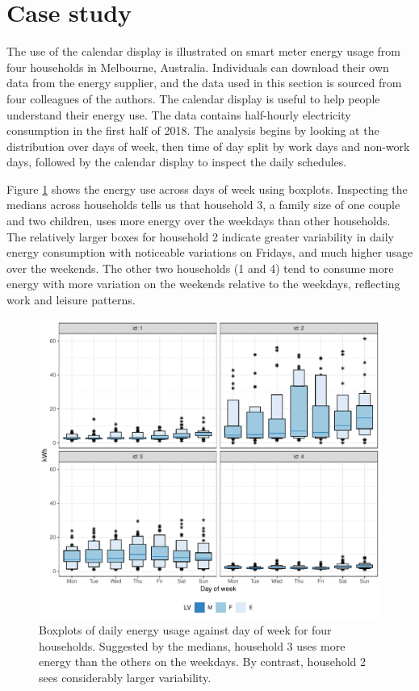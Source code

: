 \documentclass[12pt]{article}
\begin{document}
\newpage

\hypertarget{sec:case}{%
\section{Case study}\label{sec:case}}

The use of the calendar display is illustrated on smart meter energy usage from four households in Melbourne, Australia. Individuals can download their own data from the energy supplier, and the data used in this section is sourced from four colleagues of the authors. The calendar display is useful to help people understand their energy use. The data contains half-hourly electricity consumption in the first half of 2018. The analysis begins by looking at the distribution over days of week, then time of day split by work days and non-work days, followed by the calendar display to inspect the daily schedules.

Figure \ref{fig:dow} shows the energy use across days of week using boxplots. Inspecting the medians across households tells us that household 3, a family size of one couple and two children, uses more energy over the weekdays than other households. The relatively larger boxes for household 2 indicate greater variability in daily energy consumption with noticeable variations on Fridays, and much higher usage over the weekends. The other two households (1 and 4) tend to consume more energy with more variation on the weekends relative to the weekdays, reflecting work and leisure patterns.

\begin{figure}

{\centering \includegraphics[width=\textwidth]{figure/dow-1} 

}

\caption{Boxplots of daily energy usage against day of week for four households. Suggested by the medians, household 3 uses more energy than the others on the weekdays. By contrast, household 2 sees considerably larger variability.}\label{fig:dow}
\end{figure}
\end{document}
